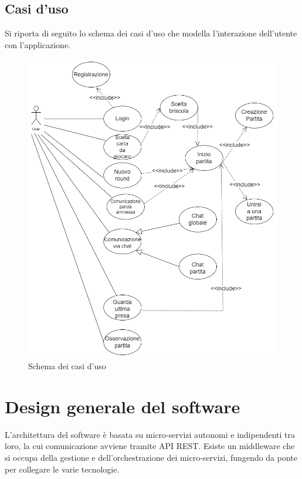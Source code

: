 \subsection{Casi d'uso}
Si riporta di seguito lo schema dei casi d'uso che modella l'interazione dell'utente con l'applicazione.
\begin{figure}[h!]
\centering 
\includegraphics[scale=0.45]{report/img/Casi_duso.png}
\caption{Schema dei casi d'uso}
\label{use_case}
\end{figure}

\section{Design generale del software}

L'architettura del software è basata su micro-servizi autonomi e indipendenti tra loro, la cui comunicazione avviene tramite API REST.
Esiste un middleware che si occupa della gestione e dell'orchestrazione dei micro-servizi, fungendo da ponte per collegare le varie tecnologie.

